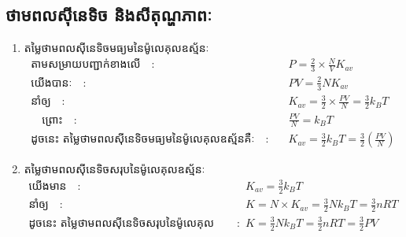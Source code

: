 		\subsection{ថាមពលសុីនេទិច និងសីតុណ្ហភាពៈ}
		\begin{enumerate}[m]
			\item {\kml \color{magenta} តម្លៃថាមពលសុីនេទិចមធ្យមនៃម៉ូលេគុលឧស្ម័នៈ}
			\begin{align*}
			\text{តាមសម្រាយបញ្ជាក់ខាងលើ}\quad :&\quad P=\frac{2}{3}\times\frac{N}{V}K_{av}\quad\\ \text{យើងបានៈ}\quad :&\quad PV=\frac{2}{3}NK_{av}\\
			\text{នាំឲ្យ}\quad :&\quad K_{av}=\frac{3}{2}\times\frac{PV}{N}=\frac{3}{2}k_{B}T\\\quad\text{ព្រោះ}\quad :& \quad \frac{PV}{N}=k_{B}T\\
			\text{ដូចនេះ តម្លៃថាមពលសុីនេទិចមធ្យមនៃម៉ូលេគុលឧស្ម័នគឺៈ}\quad :& \quad K_{av}=\frac{3}{2}k_{B}T=\frac{3}{2}\left(\frac{PV}{N}\right)
			\end{align*}
			\item {\kml \color{magenta} តម្លៃថាមពលសុីនេទិចសរុបនៃម៉ូលេគុលឧស្ម័នៈ}
			\begin{align*}
			\text{យើងមាន}\quad :&\quad K_{av}=\frac{3}{2}k_{B}T\\
			\text{នាំឲ្យ}\quad :&\quad K=N\times K_{av}=\frac{3}{2}Nk_{B}T=\frac{3}{2}nRT\\
			\text{ដូចនេះ តម្លៃថាមពលសុីនេទិចសរុបនៃម៉ូលេគុលឧស្ម័នគឺៈ}\quad :& \quad K=\frac{3}{2}Nk_{B}T=\frac{3}{2}nRT=\frac{3}{2}PV
			\end{align*}
		\end{enumerate}
